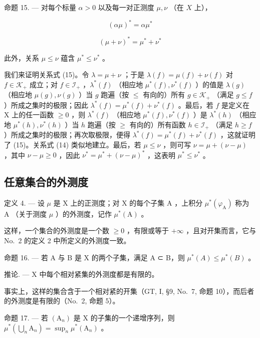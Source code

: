 命题 15. --- 对每个标量 \(\alpha > 0\) 以及每一对正测度 \(\mu, \nu\) （在 \(X\) 上），

\[
(\alpha \mu) ^ {*} = \alpha \mu^ {*}\tag{14}
\]

\[
(\mu + \nu) ^ {*} = \mu^ {*} + \nu^ {*}\tag{15}
\]

此外，关系 \(\mu \leqslant \nu\) 蕴含 \(\mu^{*} \leqslant \nu^{*}\) 。

我们来证明关系式 (15)。令 \(\lambda = \mu + \nu\) ；于是 \(\lambda(f) = \mu(f) + \nu(f)\) 对 \(f \in \mathcal{K}_+\) 成立；对 \(f \in \mathcal{I}_+\) ，\(\lambda^*(f)\) （相应地 \(\mu^*(f), \nu^*(f)\) ）的值是 \(\lambda(g)\) （相应地 \(\mu(g), \nu(g)\) ）当 \(g\) 跑遍（按 \(\leqslant\) 有向的）所有 \(g \in \mathcal{K}_+\) （满足 \(g \leqslant f\) ）所成之集时的极限；因此 \(\lambda^*(f) = \mu^*(f) + \nu^*(f)\) 。最后，若 \(f\) 是定义在 X 上的任一函数 \(\geqslant 0\) ，则 \(\lambda^*(f)\) （相应地 \(\mu^*(f), \nu^*(f)\) ）是 \(\lambda^*(h)\) （相应地 \(\mu^*(h), \nu^*(h)\) ）当 \(h\) 跑遍（按 \(\geqslant\) 有向的）所有函数 \(h \in \mathcal{I}_+\) （满足 \(h \geqslant f\) ）所成之集时的极限；再次取极限，便得 \(\lambda^*(f) = \mu^*(f) + \nu^*(f)\) ，这就证明了 (15)。关系式 (14) 类似地建立。最后，若 \(\mu \leqslant \nu\) ，则可写 \(\nu = \mu + (\nu - \mu)\) ，其中 \(\nu - \mu \geqslant 0\) ，因此 \(\nu^* = \mu^* + (\nu - \mu)^*\) ，这表明 \(\mu^* \leqslant \nu^*\) 。

\subsection{任意集合的外测度}

定义 4. --- 设 \(\mu\) 是 X 上的正测度；对 X 的每个子集 A ，上积分 \(\mu^{*}(\varphi_{\mathrm{A}})\) 称为 A （关于测度 \(\mu\) ）的外测度，记作 \(\mu^{*}(\mathrm{A})\) 。

这样，一个集合的外测度是一个数 \(\geqslant0\) ，有限或等于 \(+\infty\) ，且对开集而言，它与 No.~2 的定义 2 中所定义的外测度一致。

命题 16. --- 若 A 与 B 是 X 的两个子集，满足 A ⊂ B，则 \(\mu^{*}(A) \leqslant \mu^{*}(B)\) 。

推论. --- X 中每个相对紧集的外测度都是有限的。

事实上，这样的集合含于一个相对紧的开集（GT, I, §9, No.~7, 命题 10），而后者的外测度是有限的（No.~2, 命题 5）。

命题 17. --- 若 \((\mathrm{A}_{n})\) 是 X 的子集的一个递增序列，则 \(\mu^{*}(\bigcup_{n}\mathrm{A}_{n})=\sup_{n}\mu^{*}(\mathrm{A}_{n})\) 。

